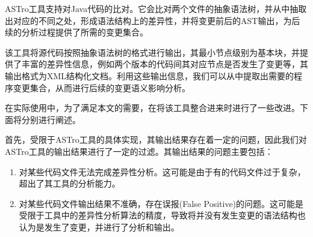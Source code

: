 %
%
%
%

ASTro工具支持对Java代码的比对。它会比对两个文件的抽象语法树，并从中抽取出对应的不同之处，形成语法结构上的差异性，并将变更前后的AST输出，为后续的分析过程提供了所需的变更集合。

该工具将源代码按照抽象语法树的格式进行输出，其最小节点级别为基本块，并提供了丰富的差异性信息，例如两个版本的代码间其对应节点是否发生了变更等，其输出格式为XML结构化文档。利用这些输出信息，我们可以从中提取出需要的程序变更集合，从而进行后续的变更语义影响分析。

在实际使用中，为了满足本文的需要，在将该工具整合进来时进行了一些改进。下面将分别进行阐述。

首先，受限于ASTro工具的具体实现，其输出结果存在着一定的问题，因此我们对ASTro工具的输出结果进行了一定的过滤。其输出结果的问题主要包括：
\begin{enumerate}
	\item 对某些代码文件无法完成差异性分析。这可能是由于有的代码文件过于复杂，超出了其工具的分析能力。
	\item 对某些代码文件输出结果不准确，存在误报(False Positive)的问题。这可能是受限于工具中的差异性分析算法的精度，导致将并没有发生变更的语法结构也认为是发生了变更，并进行了分析和输出。
\end{enumerate}

